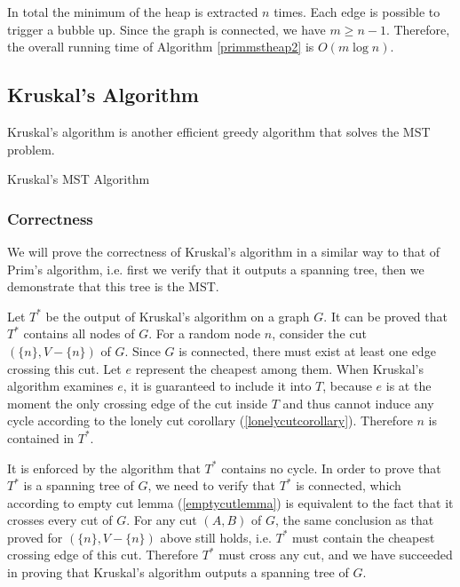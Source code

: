 In total the minimum of the heap is extracted $n$ times. Each edge is possible to trigger a bubble up. Since the graph is connected, we have $m\geq n-1$. Therefore, the overall running time of Algorithm \ref{primmstheap2} is $O(m\log n)$.
\subsection{Kruskal's Algorithm}
Kruskal's algorithm is another efficient greedy algorithm that solves the MST problem.
\begin{algorithm}[ht]
\caption{Kruskal's MST Algorithm}\label{kruskalmst}
\begin{algorithmic}[1]
\EndIf
\EndFor
\end{algorithmic}
\end{algorithm}
\subsubsection{Correctness}
We will prove the correctness of Kruskal's algorithm in a similar way to that of Prim's algorithm, i.e. first we verify that it outputs a spanning tree, then we demonstrate that this tree is the MST.

Let $T^*$ be the output of Kruskal's algorithm on a graph $G$. It can be proved that $T^*$ contains all nodes of $G$. For a random node $n$, consider the cut $(\{n\},V-\{n\})$ of $G$. Since $G$ is connected, there must exist at least one edge crossing this cut. Let $e$ represent the cheapest among them. When Kruskal's algorithm examines $e$, it is guaranteed to include it into $T$, because $e$ is at the moment the only crossing edge of the cut inside $T$ and thus cannot induce any cycle according to the lonely cut corollary (\ref{lonelycutcorollary}). Therefore $n$ is contained in $T^*$. 

It is enforced by the algorithm that $T^*$ contains no cycle. In order to prove that $T^*$ is a spanning tree of $G$, we need to verify that $T^*$ is connected, which according to empty cut lemma (\ref{emptycutlemma}) is equivalent to the fact that it crosses every cut of $G$. For any cut $(A,B)$ of $G$, the same conclusion as that proved for $(\{n\},V-\{n\})$ above still holds, i.e. $T^*$ must contain the cheapest crossing edge of this cut. Therefore $T^*$ must cross any cut, and we have succeeded in proving that Kruskal's algorithm outputs a spanning tree of $G$.   

